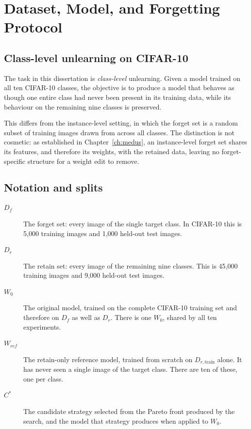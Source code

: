 \section{Dataset, Model, and Forgetting Protocol}
\label{sec:exp-data}

\subsection{Class-level unlearning on CIFAR-10}

The task in this dissertation is \emph{class-level} unlearning. Given a model
trained on all ten CIFAR-10 classes, the objective is to produce a model that
behaves as though one entire class had never been present in its training data,
while its behaviour on the remaining nine classes is preserved.

This differs from the instance-level setting, in which the forget set is a random
subset of training images drawn from across all classes. The distinction is not
cosmetic: as established in Chapter~\ref{ch:medus}, an instance-level forget set
shares its features, and therefore its weights, with the retained data, leaving no
forget-specific structure for a weight edit to remove.

\subsection{Notation and splits}

\begin{description}
  \item[$D_f$] The forget set: every image of the single target class. In
    CIFAR-10 this is 5{,}000 training images and 1{,}000 held-out test images.
  \item[$D_r$] The retain set: every image of the remaining nine classes. This is
    45{,}000 training images and 9{,}000 held-out test images.
  \item[$W_0$] The original model, trained on the complete CIFAR-10 training set
    and therefore on $D_f$ as well as $D_r$. There is one $W_0$, shared by all ten
    experiments.
  \item[$W_{ref}$] The retain-only reference model, trained from scratch on
    $D_{r,\text{train}}$ alone. It has never seen a single image of the target
    class. There are ten of these, one per class.
  \item[$C^{*}$] The candidate strategy selected from the Pareto front produced by
    the search, and the model that strategy produces when applied to $W_0$.
\end{description}

